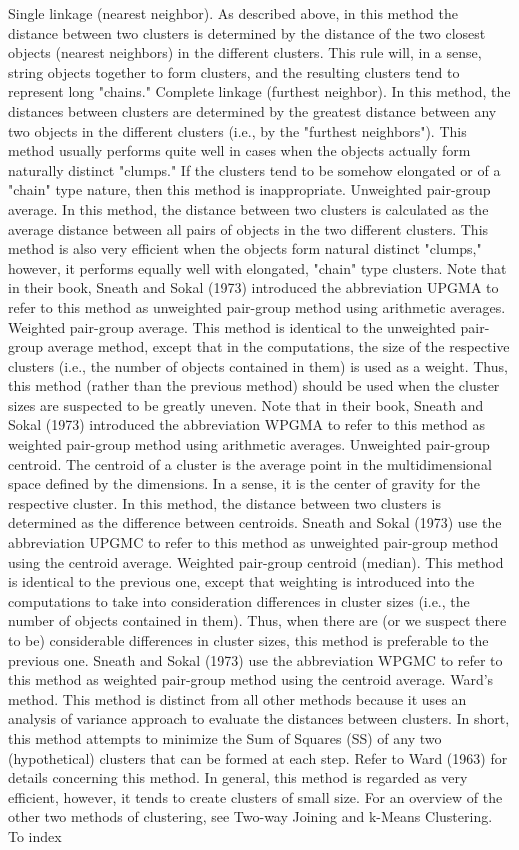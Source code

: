 Single linkage (nearest neighbor). As described above, in this method the distance between two clusters is determined by the distance of the two closest objects (nearest neighbors) in the different clusters. This rule will, in a sense, string objects together to form clusters, and the resulting clusters tend to represent long "chains."
Complete linkage (furthest neighbor). In this method, the distances between clusters are determined by the greatest distance between any two objects in the different clusters (i.e., by the "furthest neighbors"). This method usually performs quite well in cases when the objects actually form naturally distinct "clumps." If the clusters tend to be somehow elongated or of a "chain" type nature, then this method is inappropriate.
Unweighted pair-group average. In this method, the distance between two clusters is calculated as the average distance between all pairs of objects in the two different clusters. This method is also very efficient when the objects form natural distinct "clumps," however, it performs equally well with elongated, "chain" type clusters. Note that in their book, Sneath and Sokal (1973) introduced the abbreviation UPGMA to refer to this method as unweighted pair-group method using arithmetic averages.
Weighted pair-group average. This method is identical to the unweighted pair-group average method, except that in the computations, the size of the respective clusters (i.e., the number of objects contained in them) is used as a weight. Thus, this method (rather than the previous method) should be used when the cluster sizes are suspected to be greatly uneven. Note that in their book, Sneath and Sokal (1973) introduced the abbreviation WPGMA to refer to this method as weighted pair-group method using arithmetic averages.
Unweighted pair-group centroid. The centroid of a cluster is the average point in the multidimensional space defined by the dimensions. In a sense, it is the center of gravity for the respective cluster. In this method, the distance between two clusters is determined as the difference between centroids. Sneath and Sokal (1973) use the abbreviation UPGMC to refer to this method as unweighted pair-group method using the centroid average.
Weighted pair-group centroid (median). This method is identical to the previous one, except that weighting is introduced into the computations to take into consideration differences in cluster sizes (i.e., the number of objects contained in them). Thus, when there are (or we suspect there to be) considerable differences in cluster sizes, this method is preferable to the previous one. Sneath and Sokal (1973) use the abbreviation WPGMC to refer to this method as weighted pair-group method using the centroid average.
Ward's method. This method is distinct from all other methods because it uses an analysis of variance approach to evaluate the distances between clusters. In short, this method attempts to minimize the Sum of Squares (SS) of any two (hypothetical) clusters that can be formed at each step. Refer to Ward (1963) for details concerning this method. In general, this method is regarded as very efficient, however, it tends to create clusters of small size.
For an overview of the other two methods of clustering, see Two-way Joining and k-Means Clustering.
To index



